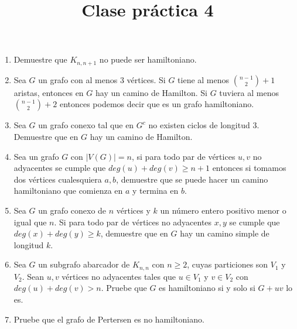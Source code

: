\documentclass{article}
\begin{document}
\title{Clase pr\'actica 4}
\maketitle

\begin{enumerate}
    \item Demuestre que $K_{n, n+1}$ no puede ser hamiltoniano.
    \item Sea $G$ un grafo con al menos $3$ v\'ertices. Si $G$ tiene al menos $\binom{n-1}{2} + 1$ aristas, entonces en $G$ hay un camino de Hamilton. Si $G$ tuviera al menos $\binom{n-1}{2} + 2$ entonces podemos decir que es un grafo hamiltoniano.
    \item Sea $G$ un grafo conexo tal que en $G^c$ no existen ciclos de longitud $3$. Demuestre que en $G$ hay un camino de Hamilton.
    \item Sea un grafo $G$ con $|V(G)|=n$, si para todo par de v\'ertices $u, v$ no adyacentes se cumple que $deg(u)+deg(v) \geq n+1$ entonces si tomamos dos v\'ertices cualesquiera $a, b$, demuestre que se puede hacer un camino hamiltoniano que comienza en $a$ y termina en $b$.
    \item Sea $G$ un grafo conexo de $n$ v\'ertices y $k$ un n\'umero entero positivo menor o igual que $n$. Si para todo par de v\'ertices no adyacentes $x, y$ se cumple que $deg(x)+deg(y) \geq k$, demuestre que en $G$ hay un camino simple de longitud $k$.
    \item Sea $G$ un subgrafo abarcador de $K_{n,n}$ con $n \geq 2$, cuyas particiones son $V_1$ y $V_2$. Sean $u,v$ v\'ertices no adyacentes tales que $u \in V_1$ y $v \in V_2$ con $deg(u) + deg(v) > n$. Pruebe que $G$ es hamiltoniano si y solo si $G + uv$ lo es. 
    \item Pruebe que el grafo de Pertersen es no hamiltoniano.
\end{enumerate}
\end{document}
